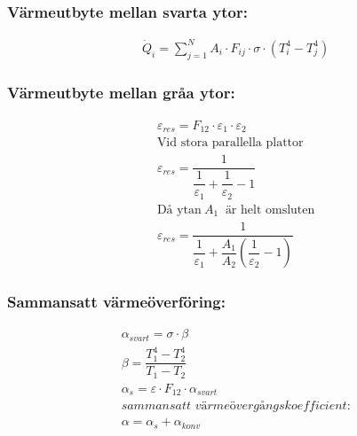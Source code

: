 \subsubsection*{Värmeutbyte mellan svarta ytor:}
\begin{align*}
	& \dot{Q}_i = \sum\limits_{j=1}^N A_i \cdot F_{ij} \cdot \sigma \cdot \left( T_i^4 - T_j^4 \right) 
\end{align*}
\subsubsection*{Värmeutbyte mellan gråa ytor:}
\begin{align*}
&	\varepsilon_{res} = F_{12} \cdot \varepsilon_{1} \cdot \varepsilon_{2} \\
& \text{Vid stora parallella plattor} \\
& \varepsilon_{res} = \dfrac{1}{\dfrac{1}{\varepsilon_{1}} + \dfrac{1}{\varepsilon_{2}} -1 } \\
& \text{Då ytan} \ A_1 \ \text{ är helt omsluten} \\
& \varepsilon_{res} = \dfrac{1}{\dfrac{1}{\varepsilon_{1}} + \dfrac{A_1}{A_2}\left(\dfrac{1}{\varepsilon_{2}} -1 \right)}
\end{align*}
\subsubsection*{Sammansatt värmeöverföring:}
\begin{align*}
	& \alpha_{svart} = \sigma \cdot \beta \\
	& \beta = \dfrac{T_1^4 - T_2^4}{T_1 - T_2} \\
	& \alpha_s = \varepsilon \cdot F_{12} \cdot \alpha_{svart} \\
	& \textit{sammansatt värmeövergångskoefficient:} \\
	& \alpha = \alpha_s + \alpha_{konv}
\end{align*}

